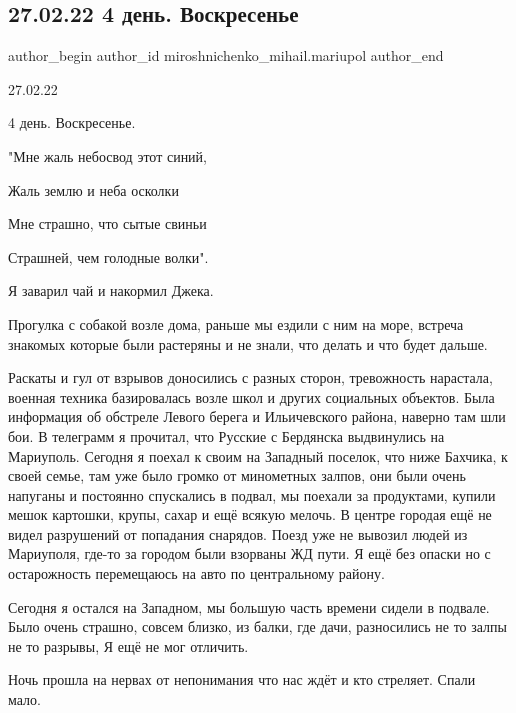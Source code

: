  
 
 
 
 

\subsection{27.02.22 4 день. Воскресенье}
\label{sec:27_02_2023.fb.miroshnichenko_mihail.mariupol.1.27_02_22_4_den__vosk}

\ifcmt
 author_begin
   author_id miroshnichenko_mihail.mariupol
 author_end
\fi

27.02.22

4 день. Воскресенье.

"Мне жаль небосвод этот синий,

Жаль землю и неба осколки

Мне страшно, что сытые свиньи

Страшней, чем голодные волки".

Я заварил чай и накормил Джека.

Прогулка с собакой возле дома, раньше мы ездили с ним на море,  встреча
знакомых которые были растеряны и не знали, что делать и что будет дальше.

Раскаты и гул от взрывов доносились с разных сторон, тревожность нарастала,
военная техника базировалась возле школ и других социальных объектов. Была
информация об обстреле Левого берега и Ильичевского района, наверно там шли
бои. В телеграмм я прочитал, что Русские с Бердянска выдвинулись на Мариуполь.
Сегодня я поехал к своим на Западный поселок, что ниже Бахчика, к своей семье,
там уже было громко от минометных залпов, они были очень напуганы и постоянно
спускались в подвал, мы поехали за продуктами, купили мешок картошки, крупы,
сахар и ещё всякую мелочь. В центре городая ещё не видел разрушений от
попадания снарядов. Поезд уже не вывозил людей из Мариуполя, где-то за городом
были взорваны ЖД пути. Я ещё без опаски но с остарожность перемещаюсь на авто
по центральному району. 

Сегодня я остался на Западном, мы большую часть времени сидели в подвале. Было
очень страшно, совсем близко, из балки, где дачи, разносились не то залпы не то
разрывы, Я ещё не мог отличить.

Ночь прошла на нервах от непонимания что нас ждёт и кто стреляет. Спали мало.

